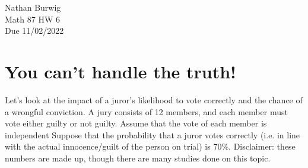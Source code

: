 \documentclass[11pt]{article}
\begin{document}
    \noindent Nathan Burwig \\
    Math 87 HW 6 \\
    Due 11/02/2022
    
    \hrulefill

    \section{You can't handle the truth!}

    Let’s look at the impact of a juror’s likelihood to vote correctly and the chance of a wrongful
    conviction. A jury consists of 12 members, and each member must vote either guilty or not guilty.
    Assume that the vote of each member is independent Suppose that the probability that a juror votes
    correctly (i.e. in line with the actual innocence/guilt of the person on trial)
    is 70\%. Disclaimer: these numbers are made up, though there are many studies done on this topic.
\end{document}
